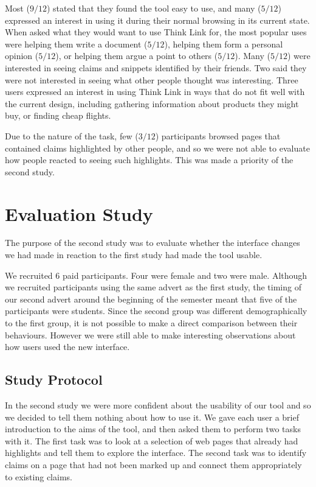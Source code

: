 \documentclass{chi2009}
\newcommand{\todo}[1]{}
\begin{document}
Most ($9/12$) stated that they found the tool easy to use, and many ($5/12$) expressed an interest in using it during their normal browsing in its current state. When asked what they would want to use Think Link for, the most popular uses were helping them write a document ($5/12$), helping them form a personal opinion ($5/12$), or helping them argue a point to others ($5/12$). Many ($5/12$) were interested in seeing claims and snippets identified by their friends. Two said they were not interested in seeing what other people thought was interesting. Three users expressed an interest in using Think Link in ways that do not fit well with the current design, including gathering information about products they might buy, or finding cheap flights.

Due to the nature of the task, few ($3/12$) participants browsed pages that contained claims highlighted by other people, and so we were not able to evaluate how people reacted to seeing such highlights. This was made a priority of the second study.

\todo{mention people not being sure how broad a topic should be}
\todo{mention people creating claim in one topic and not being found in other related topics}


\section{Evaluation Study}

The purpose of the second study was to evaluate whether the interface changes we had made in reaction to the first study had made the tool usable. 

We recruited 6 paid participants. Four were female and two were male. Although we recruited participants using the same advert as the first study, the timing of our second advert around the beginning of the semester meant that five of the participants were students. Since the second group was different demographically to the first group, it is not possible to make a direct comparison between their behaviours. However we were still able to make interesting observations about how users used the new interface.

\subsection{Study Protocol}

In the second study we were more confident about the usability of our tool and so we decided to tell them nothing about how to use it. We gave each user a brief introduction to the aims of the tool, and then asked them to perform two tasks with it. The first task was to look at a selection of web pages that already had highlights and tell them to explore the interface. The second task was to identify claims on a page that had not been marked up and connect them appropriately to existing claims.
\end{document}
